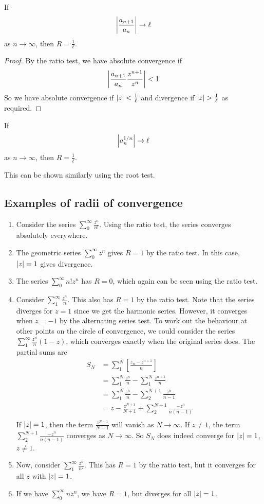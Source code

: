 \begin{lemma}
	If
	\[
		\abs{\frac{a_{n+1}}{a_n}} \to \ell
	\]
	as \(n \to \infty\), then \(R = \frac{1}{\ell}\).
\end{lemma}
\begin{proof}
	By the ratio test, we have absolute convergence if
	\[
		\abs{\frac{a_{n+1}}{a_n} \frac{z^{n+1}}{z^n}} < 1
	\]
	So we have absolute convergence if \(\abs{z} < \frac{1}{\ell}\) and divergence if \(\abs{z} > \frac{1}{\ell}\) as required.
\end{proof}
\begin{lemma}
	If
	\[
		\abs{a_n^{1/n}} \to \ell
	\]
	as \(n \to \infty\), then \(R = \frac{1}{\ell}\).
\end{lemma}
This can be shown similarly using the root test.

\subsection{Examples of radii of convergence}
\begin{enumerate}
	\item Consider the series \(\sum_0^\infty \frac{z^n}{n!}\).
	      Using the ratio test, the series converges absolutely everywhere.
	\item The geometric series \(\sum_0^\infty z^n\) gives \(R=1\) by the ratio test.
	      In this case, \(\abs{z} = 1\) gives divergence.
	\item The series \(\sum_0^\infty n!z^n\) has \(R=0\), which again can be seen using the ratio test.
	\item Consider \(\sum_1^\infty \frac{z^n}{n}\).
	      This also has \(R = 1\) by the ratio test.
	      Note that the series diverges for \(z=1\) since we get the harmonic series.
	      However, it converges when \(z = -1\) by the alternating series test.
	      To work out the behaviour at other points on the circle of convergence, we could consider the series \(\sum_1^\infty \frac{z^n}{n}(1-z)\), which converges exactly when the original series does.
	      The partial sums are
	      \begin{align*}
		      S_N & = \sum_1^N \left[ \frac{z_n - z^{n+1}}{n} \right]            \\
		          & = \sum_1^N \frac{z^n}{n} - \sum_1^N \frac{z^{n+1}}{n}        \\
		          & = \sum_1^N \frac{z^n}{n} - \sum_2^{N+1} \frac{z^n}{n-1}      \\
		          & = z - \frac{z^{N+1}}{N+1} + \sum_2^{N+1} \frac{-z^n}{n(n-1)} \\
	      \end{align*}
	      If \(\abs{z} = 1\), then the term \(\frac{z^{N+1}}{N+1}\) will vanish as \(N \to \infty\).
	      If \(z \neq 1\), the term \(\sum_2^{N+1} \frac{-z^n}{n(n-1)}\) converges as \(N \to \infty\).
	      So \(S_N\) does indeed converge for \(\abs{z} = 1\), \(z \neq 1\).
	\item Now, consider \(\sum_1^\infty \frac{z^n}{n^2}\).
	      This has \(R=1\) by the ratio test, but it converges for all \(z\) with \(\abs{z} = 1\).
	\item If we have \(\sum_0^\infty nz^n\), we have \(R=1\), but diverges for all \(\abs{z} = 1\).
\end{enumerate}
